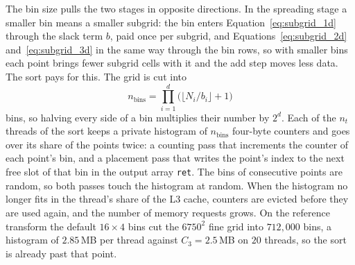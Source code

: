 The bin size pulls the two stages in opposite directions. In the spreading stage a smaller bin means a smaller subgrid: the bin enters Equation~\eqref{eq:subgrid_1d} through the slack term $b$, paid once per subgrid, and Equations~\eqref{eq:subgrid_2d} and~\eqref{eq:subgrid_3d} in the same way through the bin rows, so with smaller bins each point brings fewer subgrid cells with it and the add step moves less data. The sort pays for this. The grid is cut into
\begin{equation}
    n_{\mathrm{bins}} = \prod_{i=1}^{d} \bigl(\lfloor N_i / b_i \rfloor + 1\bigr)
    \label{eq:nbins}
\end{equation}
bins, so halving every side of a bin multiplies their number by $2^d$. Each of the $n_t$ threads of the sort keeps a private histogram of $n_{\mathrm{bins}}$ four-byte counters and goes over its share of the points twice: a counting pass that increments the counter of each point's bin, and a placement pass that writes the point's index to the next free slot of that bin in the output array \texttt{ret}. The bins of consecutive points are random, so both passes touch the histogram at random. When the histogram no longer fits in the thread's share of the L3 cache, counters are evicted before they are used again, and the number of memory requests grows. On the reference transform the default $16 \times 4$ bins cut the $6750^2$ fine grid into $712{,}000$ bins, a histogram of $2.85$\,MB per thread against $C_3 = 2.5$\,MB on $20$ threads, so the sort is already past that point.

